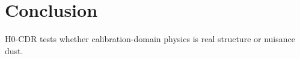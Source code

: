 \section{Conclusion}

H0-CDR tests whether calibration-domain physics is real structure or nuisance dust.
